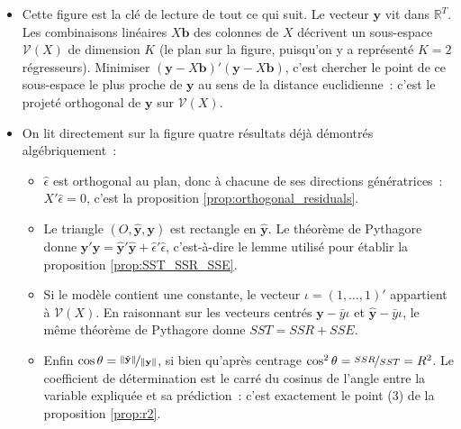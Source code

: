 \documentclass[10pt]{beamer}
\begin{document}
\begin{notes}

  \begin{itemize}

  \item Cette figure est la clé de lecture de tout ce qui suit. Le vecteur $\mathbf y$
    vit dans $\mathbb R^T$. Les combinaisons linéaires $X\mathbf b$ des colonnes
    de $X$ décrivent un sous-espace $\mathcal V(X)$ de dimension $K$ (le plan sur la
    figure, puisqu'on y a représenté $K=2$ régresseurs). Minimiser
    $(\mathbf y-X\mathbf b)'(\mathbf y-X\mathbf b)$, c'est chercher le point de ce
    sous-espace le plus proche de $\mathbf y$ au sens de la distance euclidienne~:
    c'est le projeté orthogonal de $\mathbf y$ sur $\mathcal V(X)$.\newline

  \item On lit directement sur la figure quatre résultats déjà démontrés
    algébriquement~:
    \begin{itemize}
    \item $\hat\epsilon$ est orthogonal au plan, donc à chacune de ses directions
      génératrices~: $X'\hat\epsilon = 0$, c'est la proposition
      \ref{prop:orthogonal_residuals}.\newline
    \item Le triangle $(O, \hat{\mathbf y}, \mathbf y)$ est rectangle en
      $\hat{\mathbf y}$. Le théorème de Pythagore donne
      $\mathbf y'\mathbf y = \hat{\mathbf y}'\hat{\mathbf y} + \hat\epsilon'\hat\epsilon$,
      c'est-à-dire le lemme utilisé pour établir la proposition
      \ref{prop:SST_SSR_SSE}.\newline
    \item Si le modèle contient une constante, le vecteur $\iota=(1,\dots,1)'$
      appartient à $\mathcal V(X)$. En raisonnant sur les vecteurs centrés
      $\mathbf y - \bar y\iota$ et $\hat{\mathbf y}-\bar y\iota$, le même théorème de
      Pythagore donne $SST = SSR + SSE$.\newline
    \item Enfin $\cos\theta = \nicefrac{\|\hat{\mathbf y}\|}{\|\mathbf y\|}$, si bien
      qu'après centrage $\cos^2\theta = \nicefrac{SSR}{SST} = R^2$. Le coefficient de
      détermination est le carré du cosinus de l'angle entre la variable expliquée et
      sa prédiction~: c'est exactement le point (3) de la proposition
      \ref{prop:r2}.
    \end{itemize}
    \medskip


\end{itemize}
\end{notes}
\end{document}
